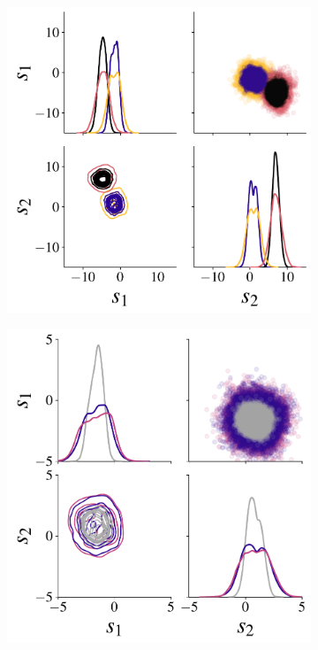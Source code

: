 \documentclass[twoside,11pt]{article}
\newcommand{\0}{\boldsymbol{0}}
\begin{document}
\begin{figure}[t]
    \centering
    \begin{subfigure}[t]{0.45\linewidth}
        \includegraphics[width=\linewidth]{plots/abf_mvn_means_sufficient_pairplot_snpe_c.pdf}
    \end{subfigure}\hfill
    \begin{subfigure}[t]{0.45\linewidth}
        \includegraphics[width=\linewidth]{plots/abf_mvn_means_sufficient_simulator_noise_pairplot_new_snpe_c.pdf}

\end{subfigure}
\end{figure}
\end{document}
